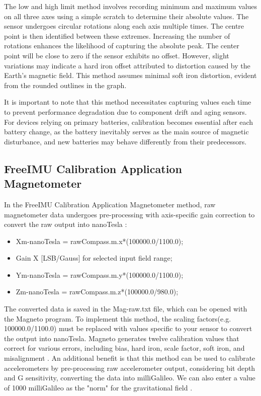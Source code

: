 The low and high limit method involves recording minimum and maximum values on all three axes using a simple scratch to determine their absolute values. The sensor undergoes circular rotations along each axis multiple times\cite{Rehder:2017}. The centre point is then identified between these extremes. Increasing the number of rotations enhances the likelihood of capturing the absolute peak. The center point will be close to zero if the sensor exhibits no offset. However, slight variations may indicate a hard iron offset attributed to distortion caused by the Earth's magnetic field\cite{Rehder:2017}. This method assumes minimal soft iron distortion, evident from the rounded outlines in the graph. 

It is important to note that this method necessitates capturing values each time to prevent performance degradation due to component drift and aging sensors\cite{Rehder:2017}. For devices relying on primary batteries, calibration becomes essential after each battery change, as the battery inevitably serves as the main source of magnetic disturbance, and new batteries may behave differently from their predecessors\cite{Rehder:2017}.

\subsection{FreeIMU Calibration Application Magnetometer}

In the FreeIMU Calibration Application Magnetometer method, raw magnetometer data undergoes pre-processing with axis-specific gain correction to convert the raw output into nanoTesla \cite{Rehder:2017}:

\begin{itemize}
	\item Xm-nanoTesla = rawCompass.m.x*(100000.0/1100.0); 
	\item Gain X [LSB/Gauss] for selected input field range;
	\item Ym-nanoTesla = rawCompass.m.y*(100000.0/1100.0);  
	\item  Zm-nanoTesla = rawCompass.m.z*(100000.0/980.0);
\end{itemize}

The converted data is saved in the Mag-raw.txt file, which can be opened with the Magneto program. To implement this method, the scaling factors(e.g. 100000.0/1100.0) must be replaced with values specific to your sensor to convert the output into nanoTesla. Magneto generates twelve calibration values that correct for various errors, including bias, hard iron, scale factor, soft iron, and misalignment \cite{Rehder:2017}. An additional benefit is that this method can be used to calibrate accelerometers by pre-processing raw accelerometer output, considering bit depth and G sensitivity, converting the data into milliGalileo. We can also enter a value of 1000 milliGalileo as the "norm" for the gravitational field \cite{Rehder:2017}.



